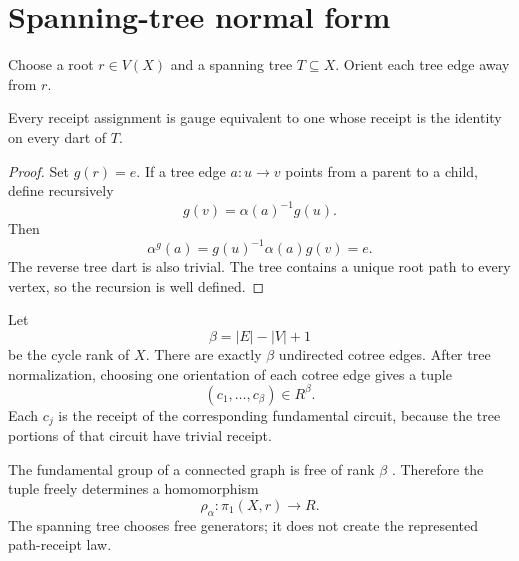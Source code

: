 \section{Spanning-tree normal form}

Choose a root $r\in V(X)$ and a spanning tree $T\subseteq X$. Orient each
tree edge away from $r$.

\begin{proposition}
Every receipt assignment is gauge equivalent to one whose receipt is the
identity on every dart of $T$.
\end{proposition}

\begin{proof}
Set $g(r)=e$. If a tree edge $a:u\to v$ points from a parent to a child,
define recursively
\[
g(v)=\alpha(a)^{-1}g(u).
\]
Then
\[
\alpha^g(a)=g(u)^{-1}\alpha(a)g(v)=e.
\]
The reverse tree dart is also trivial. The tree contains a unique root path
to every vertex, so the recursion is well defined.
\end{proof}

Let
\[
\beta=|E|-|V|+1
\]
be the cycle rank of $X$. There are exactly $\beta$ undirected cotree edges.
After tree normalization, choosing one orientation of each cotree edge gives
a tuple
\[
(c_1,\ldots,c_{\beta})\in R^{\beta}.
\]
Each $c_j$ is the receipt of the corresponding fundamental circuit, because
the tree portions of that circuit have trivial receipt.

The fundamental group of a connected graph is free of rank $\beta$
\cite{serre-trees}. Therefore the tuple freely determines a homomorphism
\[
\rho_{\alpha}:\pi_1(X,r)\longrightarrow R.
\]
The spanning tree chooses free generators; it does not create the represented
path-receipt law.

